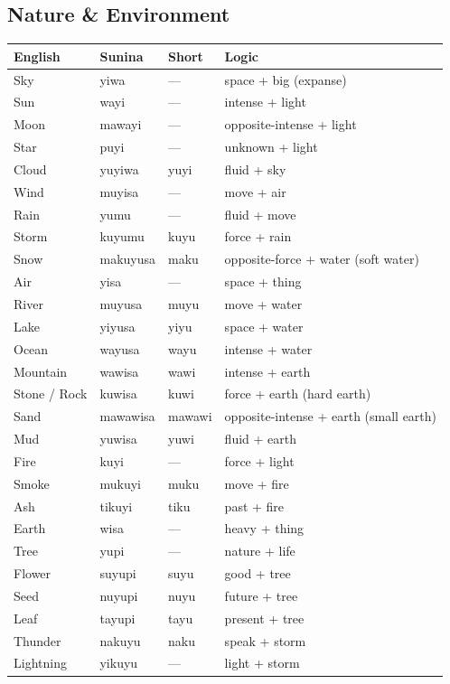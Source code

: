 \documentclass[12pt, a4paper]{article}
\begin{document}
\subsection{Nature \& Environment}
\begin{tabular}{@{}llll@{}}
\toprule
\textbf{English} & \textbf{Sunina} & \textbf{Short} & \textbf{Logic} \\ \midrule
Sky & yiwa & --- & space + big (expanse) \\
Sun & wayi & --- & intense + light \\
Moon & mawayi & --- & opposite-intense + light \\
Star & puyi & --- & unknown + light \\
Cloud & yuyiwa & yuyi & fluid + sky \\
Wind & muyisa & --- & move + air \\
Rain & yumu & --- & fluid + move \\
Storm & kuyumu & kuyu & force + rain \\
Snow & makuyusa & maku & opposite-force + water (soft water) \\
Air & yisa & --- & space + thing \\
River & muyusa & muyu & move + water \\
Lake & yiyusa & yiyu & space + water \\
Ocean & wayusa & wayu & intense + water \\
Mountain & wawisa & wawi & intense + earth \\
Stone / Rock & kuwisa & kuwi & force + earth (hard earth) \\
Sand & mawawisa & mawawi & opposite-intense + earth (small earth) \\
Mud & yuwisa & yuwi & fluid + earth \\
Fire & kuyi & --- & force + light \\
Smoke & mukuyi & muku & move + fire \\
Ash & tikuyi & tiku & past + fire \\
Earth & wisa & --- & heavy + thing \\
Tree & yupi & --- & nature + life \\
Flower & suyupi & suyu & good + tree \\
Seed & nuyupi & nuyu & future + tree \\
Leaf & tayupi & tayu & present + tree \\
Thunder & nakuyu & naku & speak + storm \\
Lightning & yikuyu & --- & light + storm \\

\end{tabular}
\end{document}
